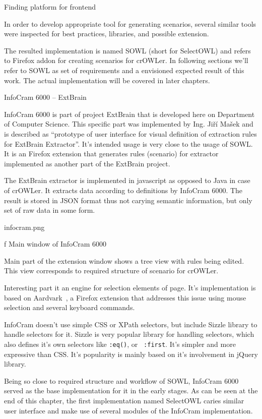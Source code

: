 \sec Finding platform for frontend

In order to develop appropriate tool for generating scenarios, several similar
tools were inspected for best practices, libraries, and possible extension. 

The resulted implementation is named SOWL (short for SelectOWL) and refers to
Firefox addon for creating scenarios for crOWLer. In following sections we'll
refer to SOWL as set of requirements and a envisioned expected result of this
work. The actual implementation will be covered in later chapters. 


\secc InfoCram 6000 -- ExtBrain

InfoCram 6000 is part of project ExtBrain 
that is developed here on Department of Computer Science. This specific part
was implemented by Ing. Jiří Mašek and is described as ``prototype of user
interface for visual definition of extraction rules for ExtBrain Extractor''.
It's intended usage is very close to the usage of SOWL. It is an Firefox
extension that generates rules (scenario) for extractor implemented as another
part of the ExtBrain project. 

The ExtBrain extractor is implemented in javascript as opposed to Java in case
of crOWLer. It extracts data according to definitions by InfoCram 6000. The
result is stored in JSON format thus not carying semantic information, but only
set of raw data in some form. 

\midinsert
\picw=7cm \cinspic infocram.png
\caption/f Main window of InfoCram 6000
\endinsert

Main part of the extension window shows a tree view with rules being edited.
This view corresponds to required structure of scenario for crOWLer. 

Interesting part it an engine for selection elements of page. It's
implementation is based on
Aardvark~, a
Firefox extension that addresses this issue using mouse selection and several
keyboard commands. 

InfoCram doesn't use simple CSS or XPath selectors, but include Sizzle library
to handle selectors for it. Sizzle is very popular library for handling
selectors, which also defines it's own selectors like {\tt :eq()}, or {\tt
:first}. It's simpler and more expressive than CSS. It's popularity is 
mainly based on it's involvement in jQuery library. 

Being so close to required structure and workflow of SOWL, InfoCram 6000 served
as the base implementation for it in the early stages. As can be seen at the end 
of this chapter, the first implementation named SelectOWL caries similar user
interface and make use of several modules of the InfoCram implementation. 


